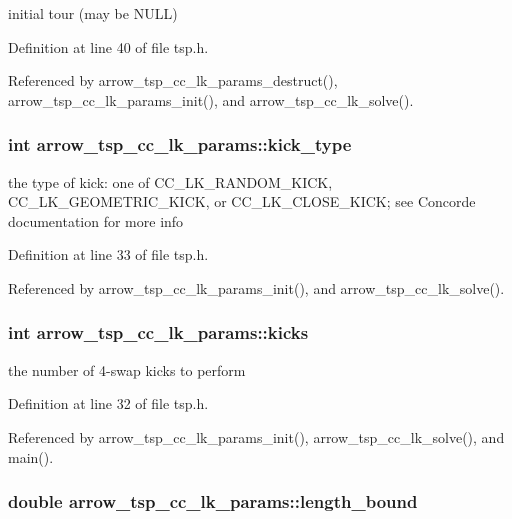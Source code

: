 initial tour (may be NULL) 

Definition at line 40 of file tsp.h.

Referenced by arrow\_\-tsp\_\-cc\_\-lk\_\-params\_\-destruct(), arrow\_\-tsp\_\-cc\_\-lk\_\-params\_\-init(), and arrow\_\-tsp\_\-cc\_\-lk\_\-solve().\hypertarget{structarrow__tsp__cc__lk__params_d5973ec2e377d3526911cfbc8deb2e47}{
\subsubsection[{kick\_\-type}]{\setlength{\rightskip}{0pt plus 5cm}int {\bf arrow\_\-tsp\_\-cc\_\-lk\_\-params::kick\_\-type}}}
\label{structarrow__tsp__cc__lk__params_d5973ec2e377d3526911cfbc8deb2e47}


the type of kick: one of CC\_\-LK\_\-RANDOM\_\-KICK, CC\_\-LK\_\-GEOMETRIC\_\-KICK, or CC\_\-LK\_\-CLOSE\_\-KICK; see Concorde documentation for more info 

Definition at line 33 of file tsp.h.

Referenced by arrow\_\-tsp\_\-cc\_\-lk\_\-params\_\-init(), and arrow\_\-tsp\_\-cc\_\-lk\_\-solve().\hypertarget{structarrow__tsp__cc__lk__params_5912b1978195270052497e56d8dbffae}{
\subsubsection[{kicks}]{\setlength{\rightskip}{0pt plus 5cm}int {\bf arrow\_\-tsp\_\-cc\_\-lk\_\-params::kicks}}}
\label{structarrow__tsp__cc__lk__params_5912b1978195270052497e56d8dbffae}


the number of 4-swap kicks to perform 

Definition at line 32 of file tsp.h.

Referenced by arrow\_\-tsp\_\-cc\_\-lk\_\-params\_\-init(), arrow\_\-tsp\_\-cc\_\-lk\_\-solve(), and main().\hypertarget{structarrow__tsp__cc__lk__params_47292f99c63b9db5bad901b5aa5e42a1}{
\subsubsection[{length\_\-bound}]{\setlength{\rightskip}{0pt plus 5cm}double {\bf arrow\_\-tsp\_\-cc\_\-lk\_\-params::length\_\-bound}}}
\label{structarrow__tsp__cc__lk__params_47292f99c63b9db5bad901b5aa5e42a1}


